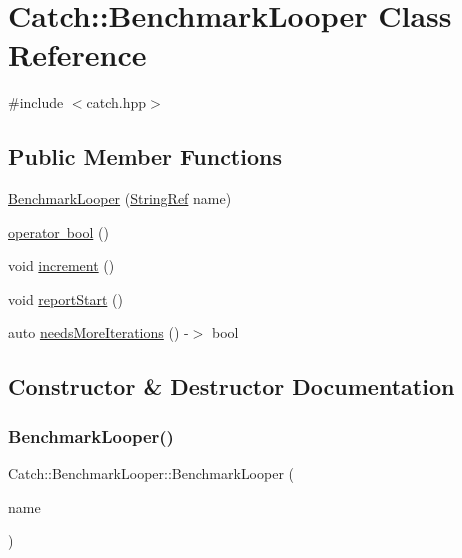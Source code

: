 \hypertarget{classCatch_1_1BenchmarkLooper}{}\section{Catch\+:\+:Benchmark\+Looper Class Reference}
\label{classCatch_1_1BenchmarkLooper}


{\ttfamily \#include $<$catch.\+hpp$>$}

\subsection*{Public Member Functions}
\begin{DoxyCompactItemize}
\item 
\mbox{\hyperlink{classCatch_1_1BenchmarkLooper_ab9ba6397306a70082f39e63a8a71bde6}{Benchmark\+Looper}} (\mbox{\hyperlink{classCatch_1_1StringRef}{String\+Ref}} name)
\item 
\mbox{\hyperlink{classCatch_1_1BenchmarkLooper_a54da41bada9da038dc05faf41d746765}{operator bool}} ()
\item 
void \mbox{\hyperlink{classCatch_1_1BenchmarkLooper_a210552aff5b19408637444d4bb35d59c}{increment}} ()
\item 
void \mbox{\hyperlink{classCatch_1_1BenchmarkLooper_a0697d1b266112b110edf2025b82c4e77}{report\+Start}} ()
\item 
auto \mbox{\hyperlink{classCatch_1_1BenchmarkLooper_a97bd944521f519b1593a5d1d2f9998fa}{needs\+More\+Iterations}} () -\/$>$ bool
\end{DoxyCompactItemize}


\subsection{Constructor \& Destructor Documentation}
\mbox{\label{classCatch_1_1BenchmarkLooper_ab9ba6397306a70082f39e63a8a71bde6}} 
\subsubsection{\texorpdfstring{Benchmark\+Looper()}{BenchmarkLooper()}}
{\footnotesize\ttfamily Catch\+::\+Benchmark\+Looper\+::\+Benchmark\+Looper (\begin{DoxyParamCaption}\item[{\mbox{\hyperlink{classCatch_1_1StringRef}{String\+Ref}}}]{name }\end{DoxyParamCaption})\hspace{0.3cm}{\ttfamily [inline]}}



